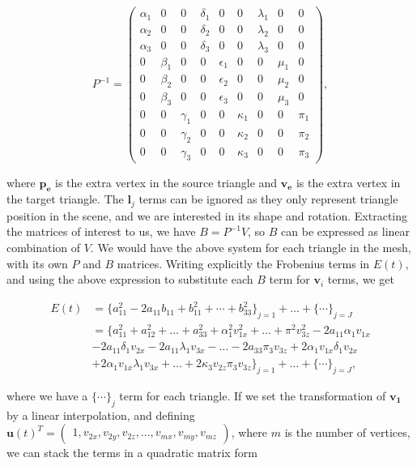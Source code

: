 \documentclass[12pt]{article}
\begin{document}
\begin{equation*}
P^{-1} = 
\begin{pmatrix}
\alpha_1 & 0 & 0 & \delta_1 & 0 & 0 & \lambda_1 & 0 & 0 \\
\alpha_2 & 0 & 0 & \delta_2 & 0 & 0 & \lambda_2 & 0 & 0 \\
\alpha_3 & 0 & 0 & \delta_3 & 0 & 0 & \lambda_3 & 0 & 0 \\
0 & \beta_1 & 0 & 0 & \epsilon_1 & 0 & 0 & \mu_1 & 0 \\
0 & \beta_2 & 0 & 0 & \epsilon_2 & 0 & 0 & \mu_2 & 0 \\
0 & \beta_3 & 0 & 0 & \epsilon_3 & 0 & 0 & \mu_3 & 0 \\
0 & 0 & \gamma_1 & 0 & 0 & \kappa_1 & 0 & 0 & \pi_1 \\
0 & 0 & \gamma_2 & 0 & 0 & \kappa_2 & 0 & 0 & \pi_2  \\
0 & 0 & \gamma_3 & 0 & 0 & \kappa_3 & 0 & 0 & \pi_3
\end{pmatrix},
\end{equation*}

where $\mathbf{p_e}$ is the extra vertex in the source triangle and $\mathbf{v_e}$ is the extra vertex in the target triangle.
The $\mathbf{l}_j$ terms can be ignored as they only represent triangle position in the scene, and we are interested in its shape and rotation.
Extracting the matrices of interest to us, we have $B = P^{-1}V$, so $B$ can be expressed as linear combination of $V$.
We would have the above system for each triangle in the mesh, with its own $P$ and $B$ matrices.  
Writing explicitly the Frobenius terms in $E(t)$, and using the above expression to substitute each $B$ term for $\mathbf{v}_i$ terms, we get

\begin{align*}
E(t) &= \lbrace a_{11}^2 - 2 a_{11} b_{11} + b_{11}^2 + \cdots +  b_{33}^2 \rbrace_{j = 1} + \ldots + \lbrace \cdots \rbrace_{j = J} \\ 
& = \lbrace a_{11}^2 + a_{12}^2 + \ldots + a_{33}^2 + \alpha_1^2 v_{1x}^2 + \ldots + \pi^2 v_{3z}^2 - 2 a_{11} \alpha_1 v_{1x} \\
& - 2 a_{11} \delta_1 v_{2x} - 2 a_{11} \lambda_1 v_{3x} - \ldots - 2 a_{33} \pi_3 v_{3z} + 2 \alpha_1 v_{1x} \delta_1 v_{2x} \\ 
& + 2 \alpha_1 v_{1x} \lambda_1 v_{3x} + \ldots + 2 \kappa_3 v_{2z} \pi_3 v_{3z} \rbrace_{j = 1} + \ldots + \lbrace \cdots \rbrace_{j = J},
\end{align*}

where we have a $\lbrace \cdots \rbrace_j$ term for each triangle.
If we set the transformation of $\mathbf{v_1}$ by a linear interpolation, and defining 
$\mathbf{u}(t)^T = \begin{pmatrix} 1, v_{2x}, v_{2y}, v_{2z}, \ldots, v_{mx}, v_{my}, v_{mz} \end{pmatrix}$, where $m$ is the number of vertices, we can stack the terms in a quadratic matrix form 
\end{document}

